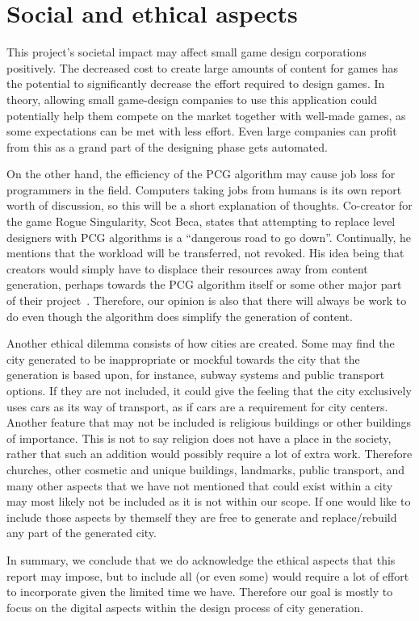 \section{Social and ethical aspects}
This project's societal impact may affect small game design corporations positively.
The decreased cost to create large amounts of content for games has the potential to significantly decrease the effort required to design games.
In theory, allowing small game-design companies to use this application could potentially help them compete on the market together with well-made games, as some expectations can be met with less effort.
Even large companies can profit from this as a grand part of the designing phase gets automated.

On the other hand, the efficiency of the PCG algorithm may cause job loss for programmers in the field.
Computers taking jobs from humans is its own report worth of discussion, so this will be a short explanation of thoughts.
Co-creator for the game Rogue Singularity, Scot Beca, states that attempting to replace level designers with PCG algorithms is a ``dangerous road to go down''.
Continually, he mentions that the workload will be transferred, not revoked.
His idea being that creators would simply have to displace their resources away from content generation, perhaps towards the PCG algorithm itself or some other major part of their project~\cite{Gamasutra}.
Therefore, our opinion is also that there will always be work to do even though the algorithm does simplify the generation of content.

Another ethical dilemma consists of how cities are created.
Some may find the city generated to be inappropriate or mockful towards the city that the generation is based upon, for instance, subway systems and public transport options.
If they are not included, it could give the feeling that the city exclusively uses cars as its way of transport, as if cars are a requirement for city centers.
Another feature that may not be included is religious buildings or other buildings of importance.
This is not to say religion does not have a place in the society, rather that such an addition would possibly require a lot of extra work.
Therefore churches, other cosmetic and unique buildings, landmarks, public transport, and many other aspects that we have not mentioned that could exist within a city may most likely not be included as it is not within our scope.
If one would like to include those aspects by themself they are free to generate and replace/rebuild any part of the generated city.

In summary, we conclude that we do acknowledge the ethical aspects that this report may impose, but to include all (or even some) would require a lot of effort to incorporate given the limited time we have.
Therefore our goal is mostly to focus on the digital aspects within the design process of city generation.
